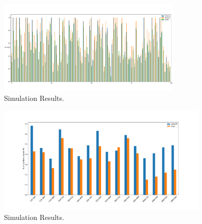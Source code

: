 %
%

\begin{figure}[!t]
\centering
\includegraphics[width=3.5in]{figures/Figure_1.pdf}
\caption{Simulation Results.}
\label{fig_alphadiff_bindiff}
\end{figure}

\begin{figure}[!t]
  \centering
  \includegraphics[width=4in]{figures/Figure_2.pdf}
  \caption{Simulation Results.}
  \label{fig_alphadiff_bingo_xcompiler}
  \end{figure}

